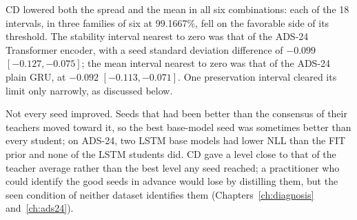 CD lowered both the spread and the mean in all six combinations: each
of the 18 intervals, in three families of six at 99.1667\%, fell on
the favorable side of its threshold. The
stability interval nearest to zero was that of the ADS-24 Transformer
encoder, with a seed standard deviation difference of $-0.099$
$[-0.127, -0.075]$; the mean interval nearest to zero was that of the
ADS-24 plain GRU, at $-0.092$ $[-0.113, -0.071]$. One preservation interval cleared its limit only
narrowly, as discussed below.


Not every seed improved. Seeds that had been better than the consensus
of their teachers moved toward it, so the best base-model seed was
sometimes better than every student; on ADS-24, two LSTM base models
had lower NLL than the FIT prior and none of the LSTM students did.
CD gave a level close to that of the teacher average rather than the
best level any seed reached; a practitioner who could identify the good
seeds in advance would lose by distilling them, but the seen condition
of neither dataset identifies them (Chapters~\ref{ch:diagnosis}
and~\ref{ch:ads24}).

